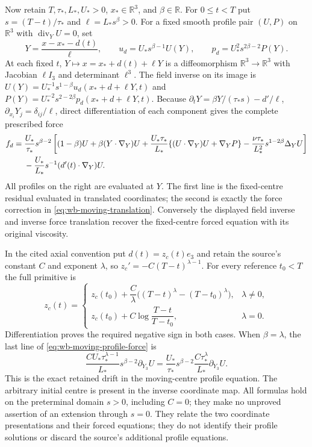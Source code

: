 Now retain $T,\tau_*,L_*,U_*>0$, $x_*\in\mathbb R^3$, and
$\beta\in\mathbb R$. For $0\leq t<T$ put
$s=(T-t)/\tau_*$ and $\ell=L_*s^\beta>0$.
For a fixed smooth profile pair $(U,P)$ on $\mathbb R^3$ with
$\operatorname{div}_Y U=0$, set
\[
 Y=\frac{x-x_*-d(t)}{\ell},\qquad
 u_d=U_*s^{\beta-1}U(Y),\qquad
 p_d=U_*^2s^{2\beta-2}P(Y).
\]
At each fixed $t$, $Y\mapsto x=x_*+d(t)+\ell Y$ is a diffeomorphism
$\mathbb R^3\to\mathbb R^3$ with Jacobian $\ell I_3$ and determinant
$\ell^3$. The field inverse on its image is
$U(Y)=U_*^{-1}s^{1-\beta}u_d(x_*+d+\ell Y,t)$ and
$P(Y)=U_*^{-2}s^{2-2\beta}p_d(x_*+d+\ell Y,t)$.
Because $\partial_tY=\beta Y/(\tau_*s)-d'/\ell$,
$\partial_{x_i}Y_j=\delta_{ij}/\ell$, direct differentiation of each
component gives the complete prescribed force
\begin{align}
 f_d={}&\frac{U_*}{\tau_*}s^{\beta-2}
 \left[(1-\beta)U+\beta(Y\cdot\nabla_Y)U
 +\frac{U_*\tau_*}{L_*}
       \{(U\cdot\nabla_Y)U+\nabla_Y P\}
 -\frac{\nu\tau_*}{L_*^2}s^{1-2\beta}\Delta_Y U\right]\notag\\
 &-\frac{U_*}{L_*}s^{-1}(d'(t)\cdot\nabla_Y)U.
 \label{eq:wb-moving-profile-force}
\end{align}
All profiles on the right are evaluated at $Y$. The first line is the
fixed-centre residual evaluated in translated coordinates; the second is
exactly the force correction in \eqref{eq:wb-moving-translation}.
Conversely the displayed field inverse and inverse force translation
recover the fixed-centre forced equation with its original viscosity.

In the cited axial convention put $d(t)=z_c(t)e_3$ and retain the source's
constant $C$ and exponent $\lambda$, so
$z_c'=-C(T-t)^{\lambda-1}$. For every reference $t_0<T$ the full primitive is
\[
 z_c(t)=
 \begin{cases}
 z_c(t_0)+\dfrac C\lambda\big((T-t)^\lambda-(T-t_0)^\lambda\big),
     &\lambda\ne0,\\[3pt]
 z_c(t_0)+C\log\!\dfrac{T-t}{T-t_0},&\lambda=0.
 \end{cases}
\]
Differentiation proves the required negative sign in both cases.
When $\beta=\lambda$, the last line of
\eqref{eq:wb-moving-profile-force} is
\[
 \frac{CU_*\tau_*^{\lambda-1}}{L_*}
 s^{\beta-2}\partial_{Y_3}U
 =\frac{U_*}{\tau_*}s^{\beta-2}
       \frac{C\tau_*^\lambda}{L_*}\partial_{Y_3}U.
\]
This is the exact retained drift in the moving-centre profile equation.
The arbitrary initial centre is present in the inverse coordinate map.
All formulas hold on the preterminal domain $s>0$, including $C=0$;
they make no unproved assertion of an extension through $s=0$.
They relate the two coordinate presentations and their forced equations;
they do not identify their profile solutions or discard the source's
additional profile equations.

